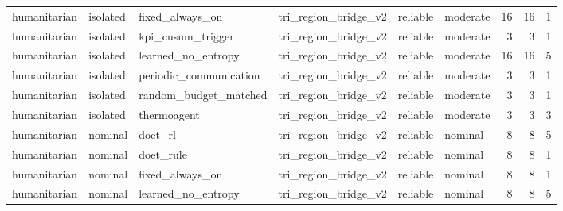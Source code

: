 \begin{table}
\begin{tabular}{llllllrrr}
humanitarian &                isolated &        fixed\_always\_on & tri\_region\_bridge\_v2 &      reliable &   moderate &        16 &                        16 &                         1 \\
humanitarian &                isolated &      kpi\_cusum\_trigger & tri\_region\_bridge\_v2 &      reliable &   moderate &         3 &                         3 &                         1 \\
humanitarian &                isolated &     learned\_no\_entropy & tri\_region\_bridge\_v2 &      reliable &   moderate &        16 &                        16 &                         5 \\
humanitarian &                isolated & periodic\_communication & tri\_region\_bridge\_v2 &      reliable &   moderate &         3 &                         3 &                         1 \\
humanitarian &                isolated &  random\_budget\_matched & tri\_region\_bridge\_v2 &      reliable &   moderate &         3 &                         3 &                         1 \\
humanitarian &                isolated &            thermoagent & tri\_region\_bridge\_v2 &      reliable &   moderate &         3 &                         3 &                         3 \\
humanitarian &                 nominal &                doet\_rl & tri\_region\_bridge\_v2 &      reliable &    nominal &         8 &                         8 &                         5 \\
humanitarian &                 nominal &              doet\_rule & tri\_region\_bridge\_v2 &      reliable &    nominal &         8 &                         8 &                         1 \\
humanitarian &                 nominal &        fixed\_always\_on & tri\_region\_bridge\_v2 &      reliable &    nominal &         8 &                         8 &                         1 \\
humanitarian &                 nominal &     learned\_no\_entropy & tri\_region\_bridge\_v2 &      reliable &    nominal &         8 &                         8 &                         5 \\
\bottomrule
\end{tabular}
\end{table}
